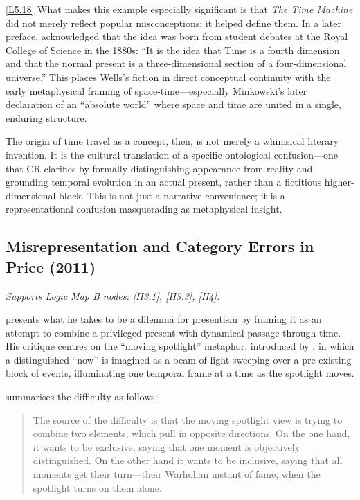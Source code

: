 \documentclass[12pt]{book}
\newcounter{logicanchor}
\newenvironment{logicanchorenv}[1]{\refstepcounter{logicanchor}\label{#1}}{}
\newcommand{\logiclink}[2]{\begin{logicanchorenv}{logic:#1}\end{logicanchorenv}\hyperref[appendix:#1]{[#1]}\xspace}
\begin{document}
\logiclink{L5.18}{} What makes this example especially significant is that \textit{The Time Machine} did not merely reflect popular misconceptions; it helped define them. In a later preface, \citet{Wells1931} acknowledged that the idea was born from student debates at the Royal College of Science in the 1880s: ``It is the idea that Time is a fourth dimension and that the normal present is a three-dimensional section of a four-dimensional universe.'' This places Wells's fiction in direct conceptual continuity with the early metaphysical framing of space-time---especially Minkowski's later declaration of an ``absolute world'' where space and time are united in a single, enduring structure.

The origin of time travel as a concept, then, is not merely a whimsical literary invention. It is the cultural translation of a specific ontological confusion---one that CR clarifies by formally distinguishing appearance from reality and grounding temporal evolution in an actual present, rather than a fictitious higher-dimensional block. This is not just a narrative convenience; it is a representational confusion masquerading as metaphysical insight.

\subsection{Misrepresentation and Category Errors in Price (2011)}\label{sec:5.3.5}
\noindent\textit{Supports Logic Map B nodes: \hyperref[appendix:II3.1]{[II3.1]}, \hyperref[appendix:II3.3]{[II3.3]}, \hyperref[appendix:II4]{[II4]}.}

\vspace{4pt}

\citet{Price2011} presents what he takes to be a dilemma for presentism by framing it as an attempt to combine a privileged present with dynamical passage through time. His critique centres on the ``moving spotlight'' metaphor, introduced by \citet{Broad1923}, in which a distinguished ``now'' is imagined as a beam of light sweeping over a pre-existing block of events, illuminating one temporal frame at a time as the spotlight moves.

\citet{Price2011} summarises the difficulty as follows:
\begin{quote}
The source of the difficulty is that the moving spotlight view is trying to combine two elements, which pull in opposite directions. On the one hand, it wants to be exclusive, saying that one moment is objectively distinguished. On the other hand it wants to be inclusive, saying that all moments get their turn---their Warholian instant of fame, when the spotlight turns on them alone.
\end{quote}
\end{document}
